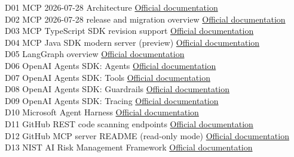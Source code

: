 \documentclass[
  10pt,
]{article}
\begin{document}
D01 \textbar{} MCP 2026-07-28 Architecture \textbar{}
\href{https://modelcontextprotocol.io/specification/2026-07-28/architecture}{Official
documentation} \textbar{}\\
D02 \textbar{} MCP 2026-07-28 release and migration overview \textbar{}
\href{https://blog.modelcontextprotocol.io/posts/2026-07-28/}{Official
documentation} \textbar{}\\
D03 \textbar{} MCP TypeScript SDK revision support \textbar{}
\href{https://ts.sdk.modelcontextprotocol.io/v2/migration/support-2026-07-28}{Official
documentation} \textbar{}\\
D04 \textbar{} MCP Java SDK modern server (preview) \textbar{}
\href{https://java.sdk.modelcontextprotocol.io/latest/server-modern/}{Official
documentation} \textbar{}\\
D05 \textbar{} LangGraph overview \textbar{}
\href{https://docs.langchain.com/oss/python/langgraph/overview}{Official
documentation} \textbar{}\\
D06 \textbar{} OpenAI Agents SDK: Agents \textbar{}
\href{https://openai.github.io/openai-agents-python/agents/}{Official
documentation} \textbar{}\\
D07 \textbar{} OpenAI Agents SDK: Tools \textbar{}
\href{https://openai.github.io/openai-agents-python/tools/}{Official
documentation} \textbar{}\\
D08 \textbar{} OpenAI Agents SDK: Guardrails \textbar{}
\href{https://openai.github.io/openai-agents-python/guardrails/}{Official
documentation} \textbar{}\\
D09 \textbar{} OpenAI Agents SDK: Tracing \textbar{}
\href{https://openai.github.io/openai-agents-python/tracing/}{Official
documentation} \textbar{}\\
D10 \textbar{} Microsoft Agent Harness \textbar{}
\href{https://learn.microsoft.com/en-us/agent-framework/concepts/harness}{Official
documentation} \textbar{}\\
D11 \textbar{} GitHub REST code scanning endpoints \textbar{}
\href{https://docs.github.com/en/rest/code-scanning/code-scanning}{Official
documentation} \textbar{}\\
D12 \textbar{} GitHub MCP server README (read-only mode) \textbar{}
\href{https://github.com/github/github-mcp-server}{Official
documentation} \textbar{}\\
D13 \textbar{} NIST AI Risk Management Framework \textbar{}
\href{https://www.nist.gov/itl/ai-risk-management-framework}{Official
documentation} \textbar{}\\
\end{document}
